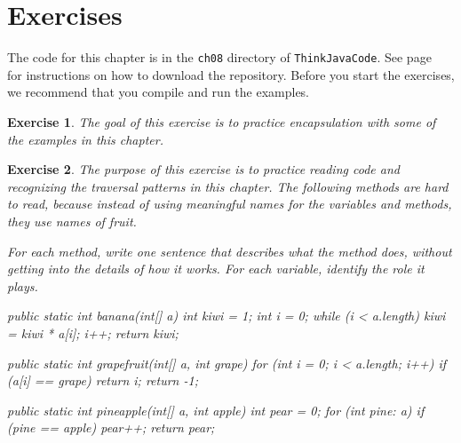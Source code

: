 \documentclass[12pt]{book}
\theoremstyle{exercise}
\newtheorem{exercise}{Exercise}[chapter]
\newcommand{\java}{\verb}%}
\begin{document}
\section{Exercises}

The code for this chapter is in the {\tt ch08} directory of {\tt ThinkJavaCode}.
See page~\pageref{code} for instructions on how to download the repository.
Before you start the exercises, we recommend that you compile and run the examples.

\begin{exercise}
The goal of this exercise is to practice encapsulation with some of the examples in this chapter.


\end{exercise}


\begin{exercise}
The purpose of this exercise is to practice reading code and recognizing the traversal patterns in this chapter.
The following methods are hard to read, because instead of using meaningful names for the variables and methods, they use names of fruit.

For each method, write one sentence that describes what the method does, without getting into the details of how it works.
For each variable, identify the role it plays.

\begin{code}
public static int banana(int[] a) {
    int kiwi = 1;
    int i = 0;
    while (i < a.length) {
        kiwi = kiwi * a[i];
        i++;
    }
    return kiwi;
}
\end{code}

\begin{code}
public static int grapefruit(int[] a, int grape) {
    for (int i = 0; i < a.length; i++) {
        if (a[i] == grape) {
            return i;
        }
    }
    return -1;
}
\end{code}

\begin{code}
public static int pineapple(int[] a, int apple) {
    int pear = 0;
    for (int pine: a) {
        if (pine == apple) {
            pear++;
        }
    }
    return pear;
}
\end{code}

\end{exercise}
\end{document}
